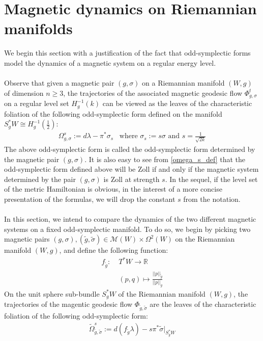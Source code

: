 \documentclass[11pt]{amsart}
\theoremstyle{plain}
\theoremstyle{definition}
\theoremstyle{remark}
\begin{document}
\section{Magnetic dynamics on Riemannian manifolds}\label{mag_dyn_riem_section}
We begin this section with a justification of the fact that odd-symplectic forms model the dynamics of a magnetic system on a regular energy level.\\
\\
Observe that given a magnetic pair $(g,\sigma)$ on a Riemannian manifold $(W,g)$ of dimension $n\geq 3$, the trajectories of the associated magnetic geodesic flow $\Phi^t_{g,\sigma}$ on a regular level set $H^{-1}_{g}(k)$ can be viewed as the leaves of the characteristic foliation of the following odd-symplectic form defined on the manifold $S_g^*W \cong H^{-1}_{g}(\frac{1}{2})$:
\begin{align}\label{omega_s_def}
    \Omega^s_{g,\sigma}:= d\lambda-\pi^*\sigma_s \;\;\; \text{where $\sigma_s:= s\sigma$ and $s = \frac{1}{\sqrt{2k}}$}
\end{align}
The above odd-symplectic form is called the odd-symplectic form determined by the magnetic pair $(g,\sigma)$. It is also easy to see from \eqref{omega_s_def} that the odd-symplectic form defined above will be Zoll if and only if the magnetic system determined by the pair $(g,\sigma)$ is Zoll at strength $s$. In the sequel, if the level set of the metric Hamiltonian is obvious, in the interest of a more concise presentation of the formulas, we will drop the constant $s$ from the notation.\\
\\
In this section, we intend to compare the dynamics of the two different magnetic systems on a fixed odd-symplectic manifold. To do so, we begin by picking two magnetic pairs $(g,\sigma) , (\tilde g,\tilde \sigma) \in \mathcal{M}(W) \times \Omega^2(W)$ on the Riemannian manifold $(W,g)$, and define the following function:
\begin{align}\label{def_of_the_function_f}
      f_{\tilde g}:\;&T^*W \rightarrow \mathbb{R}\\\nonumber
      &(p,q)\mapsto \frac{\vert\vert p\vert\vert_{\tilde g}}{\vert\vert p\vert\vert_{g}}
\end{align}
On the unit sphere sub-bundle $S_g^*W$ of the Riemannian manifold $(W,g)$, the trajectories of the magentic geodesic flow $\Phi_{\tilde g,\tilde \sigma}$ are the leaves of the characteristic foliation of the following odd-symplectic form:
\begin{align}\label{odd-symp_determiend_by_triple}
  \tilde \Omega^{s}_{\tilde g,\tilde \sigma}:=  d(f_{\tilde g}\lambda)-s\pi^*\tilde\sigma \Big|_{S_g^*W}
\end{align}
\end{document}
